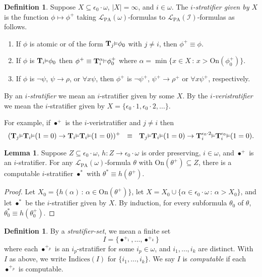 \documentclass[reqno]{article}
\theoremstyle{definition}
\newtheorem{lemma}[theorem]{Lemma}
\newtheorem{definition}[theorem]{Definition}
\def\L{\mathscr{L}}
\def\T{\mathbf{T}}
\def\indices{\mathrm{Indices}}
\def\LPA{\L_{\mathrm{PA}}}
\def\epom{\epsilon_0\cdot\omega}
\def\indset{\mathcal I}
\def\onset{\mathrm{On}}
\renewcommand{\Pr}[1]{\T_{#1}\mbox{\small${\vDash}$}}
\newcommand{\Prr}[2]{\T^{#1}_{#2}\mbox{\small${\vDash}$}}
\begin{document}
\begin{definition}
\label{stratifierdefn}
Suppose $X\subseteq\epom$, $|X|=\infty$, and $i\in\omega$.
The \emph{$i$-stratifier given by $X$}
is the function $\phi\mapsto\phi^+$ taking $\LPA(\omega)$-formulas to $\LPA(\indset)$-formulas
as follows.
\begin{enumerate}
\item If $\phi$ is atomic or of the form $\Pr j\phi_0$ with $j\not=i$, then $\phi^+\equiv\phi$.
\item If $\phi$ is $\Pr i\phi_0$ then $\phi^+\equiv \Prr\alpha i\phi^+_0$
where
$\alpha=\min\{x\in X\,:\,x>\onset(\phi^+_0)\}$.
\item If $\phi$ is $\neg\psi$, $\psi\rightarrow\rho$, or $\forall x\psi$, then
$\phi^+$ is $\neg\psi^+$, $\psi^+\rightarrow\rho^+$ or $\forall x\psi^+$, respectively.
\end{enumerate}
By an \emph{$i$-stratifier} we mean an $i$-stratifier given by some $X$.
By the \emph{$i$-veristratifier} we mean the $i$-stratifier
given by $X=\{\epsilon_0\cdot1,\epsilon_0\cdot2,\ldots\}$.
\end{definition}

For example, if $\bullet^+$ is the $i$-veristratifier and $j\not=i$ then
\[(\Pr j\Pr i(1=0)\rightarrow \Pr i\Pr i(1=0))^+ \,\,\,\,\equiv\,\,\,\,
\Pr j\Pr i(1=0)\rightarrow\Prr{\epsilon_0\cdot2}i\Prr{\epsilon_0} i(1=0).\]

\begin{lemma}
\label{stratifiermagic}
Suppose $Z\subseteq\epom$,
$h:Z\to \epom$ is order preserving, $i\in\omega$,
and $\bullet^+$ is an $i$-stratifier.
For any $\LPA(\omega)$-formula $\theta$ with $\onset(\theta^+)\subseteq Z$,
there is a computable $i$-stratifier $\bullet^*$ with $\theta^*\equiv h(\theta^+)$.
\end{lemma}

\begin{proof}
Let $X_0=\{h(\alpha)\,:\,\alpha\in\onset(\theta^+)\}$,
let $X=X_0\cup\{\alpha\in\epom\,:\,\alpha>X_0\}$,
and let $\bullet^*$ be the $i$-stratifier given by $X$.
By induction, for every subformula $\theta_0$ of $\theta$, $\theta^*_0\equiv h(\theta^+_0)$.
\end{proof}

\begin{definition}
By a \emph{stratifier-set}, we mean a finite set
\[
    I=\{\bullet^{+_1},\ldots,\bullet^{+_k}\}
\]
where each $\bullet^{+_p}$ is an $i_p$-stratifier for some $i_p\in\omega$,
and $i_1,\ldots,i_k$ are distinct.
With $I$ as above, we write $\indices(I)$ for $\{i_1,\ldots,i_k\}$.
We say $I$ is \emph{computable} if each $\bullet^{+_p}$ is computable.
\end{definition}
\end{document}
